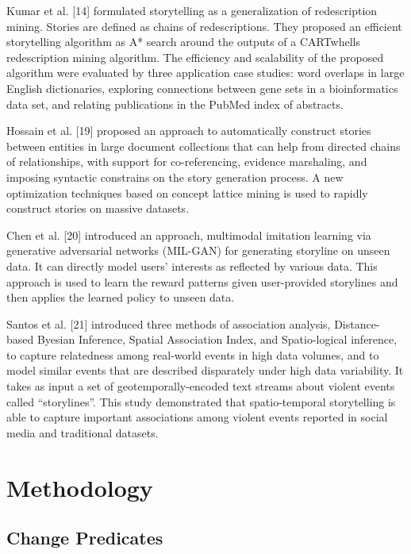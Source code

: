 \documentclass[conference]{IEEEtran}
\begin{document}
Kumar et al. [14] formulated storytelling as a generalization of redescription mining. Stories are defined as chains of redescriptions. They proposed an efficient storytelling algorithm as A* search around the outputs of a CARTwhells redescription mining algorithm. The efficiency and scalability of the proposed algorithm were evaluated by three application case studies: word overlaps in large English dictionaries, exploring connections between gene sets in a bioinformatics data set, and relating publications in the PubMed index of abstracts. 



Hossain et al. [19] proposed an approach to automatically construct stories between entities in large document collections that can help from directed chains of relationships, with support for co-referencing, evidence marshaling, and imposing syntactic constrains on the story generation process. A new optimization techniques based on concept lattice mining is used to rapidly construct stories on massive datasets. 



Chen et al. [20] introduced an approach, multimodal imitation learning via generative adversarial networks (MIL-GAN) for generating storyline on unseen data. It can directly model users’ interests as reflected by various data. This approach is used to learn the reward patterns given user-provided storylines and then applies the learned policy to unseen data.   




Santos et al. [21] introduced three methods of association analysis, Distance-based Byesian Inference, Spatial Association Index, and Spatio-logical inference, to capture relatedness among real-world events in high data volumes, and to model similar events that are described disparately under high data variability. It takes as input a set of geotemporally-encoded text streams about violent events called “storylines”. This study demonstrated that spatio-temporal storytelling is able to capture important associations among violent events reported in social media and traditional datasets. 


\section{Methodology}


\subsection{Change Predicates}
\end{document}
